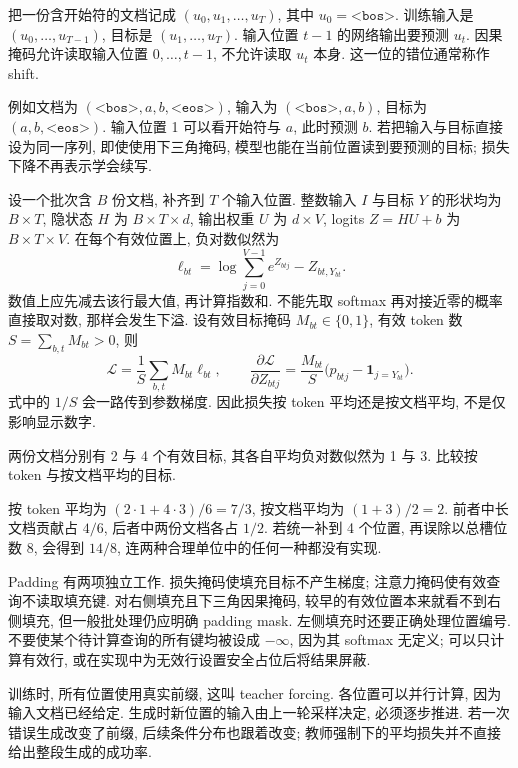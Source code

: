 \label{sec:lm-shift}
把一份含开始符的文档记成 $(u_0,u_1,\ldots,u_T)$, 其中 $u_0=\texttt{<bos>}$. 训练输入是 $(u_0,\ldots,u_{T-1})$, 目标是 $(u_1,\ldots,u_T)$. 输入位置 $t-1$ 的网络输出要预测 $u_t$. 因果掩码允许读取输入位置 $0,\ldots,t-1$, 不允许读取 $u_t$ 本身. 这一位的错位通常称作 shift.

例如文档为 $(\texttt{<bos>},a,b,\texttt{<eos>})$, 输入为 $(\texttt{<bos>},a,b)$, 目标为 $(a,b,\texttt{<eos>})$. 输入位置 1 可以看开始符与 $a$, 此时预测 $b$. 若把输入与目标直接设为同一序列, 即使使用下三角掩码, 模型也能在当前位置读到要预测的目标; 损失下降不再表示学会续写.

设一个批次含 $B$ 份文档, 补齐到 $T$ 个输入位置. 整数输入 $I$ 与目标 $Y$ 的形状均为 $B\times T$, 隐状态 $H$ 为 $B\times T\times d$, 输出权重 $U$ 为 $d\times V$, logits $Z=HU+b$ 为 $B\times T\times V$. 在每个有效位置上, 负对数似然为
\[
\ell_{bt}=\log\sum_{j=0}^{V-1}e^{Z_{btj}}-Z_{bt,Y_{bt}}.
\]
数值上应先减去该行最大值, 再计算指数和. 不能先取 softmax 再对接近零的概率直接取对数, 那样会发生下溢. 设有效目标掩码 $M_{bt}\in\{0,1\}$, 有效 token 数 $S=\sum_{b,t}M_{bt}>0$, 则
\begin{equation}\label{eq:lm-tokenloss}
\mathcal L=\frac1S\sum_{b,t}M_{bt}\ell_{bt},\qquad
\frac{\partial\mathcal L}{\partial Z_{btj}}
=\frac{M_{bt}}S\bigl(p_{btj}-\mathbf1_{j=Y_{bt}}\bigr).
\end{equation}
式中的 $1/S$ 会一路传到参数梯度. 因此损失按 token 平均还是按文档平均, 不是仅影响显示数字.

\begin{example}
两份文档分别有 2 与 4 个有效目标, 其各自平均负对数似然为 1 与 3. 比较按 token 与按文档平均的目标.
\end{example}
\begin{solution}
按 token 平均为 $(2\cdot1+4\cdot3)/6=7/3$, 按文档平均为 $(1+3)/2=2$. 前者中长文档贡献占 $4/6$, 后者中两份文档各占 $1/2$. 若统一补到 4 个位置, 再误除以总槽位数 8, 会得到 $14/8$, 连两种合理单位中的任何一种都没有实现.
\end{solution}
Padding 有两项独立工作. 损失掩码使填充目标不产生梯度; 注意力掩码使有效查询不读取填充键. 对右侧填充且下三角因果掩码, 较早的有效位置本来就看不到右侧填充, 但一般批处理仍应明确 padding mask. 左侧填充时还要正确处理位置编号. 不要使某个待计算查询的所有键均被设成 $-\infty$, 因为其 softmax 无定义; 可以只计算有效行, 或在实现中为无效行设置安全占位后将结果屏蔽.

训练时, 所有位置使用真实前缀, 这叫 teacher forcing. 各位置可以并行计算, 因为输入文档已经给定. 生成时新位置的输入由上一轮采样决定, 必须逐步推进. 若一次错误生成改变了前缀, 后续条件分布也跟着改变; 教师强制下的平均损失并不直接给出整段生成的成功率.

